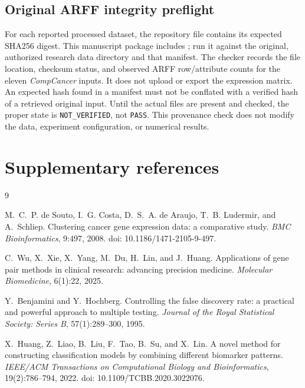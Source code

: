\documentclass[11pt, a4paper]{article}
\begin{document}
\subsection*{Original ARFF integrity preflight}

For each reported processed dataset, the repository file  contains its expected SHA256 digest. This manuscript package includes ; run it against the original, authorized research data directory and that manifest. The checker records the file location, checksum status, and observed ARFF row/attribute counts for the eleven \emph{CompCancer} inputs. It does not upload or export the expression matrix. An expected hash found in a manifest must not be conflated with a verified hash of a retrieved original input. Until the actual files are present and checked, the proper state is \texttt{NOT\_VERIFIED}, not \texttt{PASS}. This provenance check does not modify the data, experiment configuration, or numerical results.

\section*{Supplementary references}

\begin{thebibliography}{9}

M.~C.~P. de Souto, I.~G. Costa, D.~S.~A. de Araujo, T.~B. Ludermir, and A.~Schliep.
\newblock Clustering cancer gene expression data: a comparative study.
\newblock \emph{BMC Bioinformatics}, 9:497, 2008.
\newblock doi: 10.1186/1471-2105-9-497.

C.~Wu, X.~Xie, X.~Yang, M.~Du, H.~Lin, and J.~Huang.
\newblock Applications of gene pair methods in clinical research: advancing precision medicine.
\newblock \emph{Molecular Biomedicine}, 6(1):22, 2025.

Y.~Benjamini and Y.~Hochberg.
\newblock Controlling the false discovery rate: a practical and powerful approach to multiple testing.
\newblock \emph{Journal of the Royal Statistical Society: Series B}, 57(1):289--300, 1995.


X.~Huang, Z.~Liao, B.~Liu, F.~Tao, B.~Su, and X.~Lin.
\newblock A novel method for constructing classification models by combining different biomarker patterns.
\newblock \emph{IEEE/ACM Transactions on Computational Biology and Bioinformatics}, 19(2):786--794, 2022.
\newblock doi: 10.1109/TCBB.2020.3022076.

\end{thebibliography}
\end{document}
